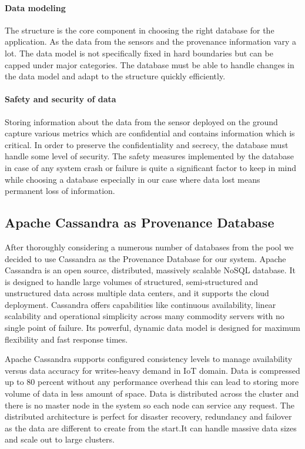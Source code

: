 \paragraph*{Data modeling}
The structure is the core component in choosing the right database for the application. As the data from the sensors and the provenance information vary a lot. The data model is not specifically fixed in hard boundaries but can be capped under major categories. The database must be able to handle changes in the data model and adapt to the structure quickly efficiently.

\paragraph*{Safety and security of data}
Storing information about the data from the sensor deployed on the ground capture various metrics which are confidential and contains information which is critical. In order to preserve the confidentiality and secrecy, the database must handle some level of security. The safety measures implemented by the database in case of any system crash or failure is quite a significant factor to keep in mind while choosing a database especially in our case where data lost means permanent loss of information.

\subsection{Apache Cassandra as Provenance Database}

After thoroughly considering a numerous number of databases from the pool we decided to use Cassandra as the Provenance Database for our system.
Apache Cassandra is an open source, distributed, massively scalable NoSQL database. It is designed to handle large volumes of structured, semi-structured and unstructured data across multiple data centers, and it supports the cloud deployment. Cassandra offers capabilities like continuous availability, linear scalability and operational simplicity across many commodity servers with no single point of failure. Its powerful, dynamic data model is designed for maximum flexibility and fast response times. 

Apache Cassandra supports configured consistency levels to manage availability versus data accuracy for writes-heavy demand in IoT domain.  Data is compressed up to 80 percent without any performance overhead this can lead to storing more volume of data in less amount of space. 
Data is distributed across the cluster and there is no master node in the system so each node can service any request. The distributed architecture is perfect for disaster recovery, redundancy and failover as the data are different to create from the start.It can handle massive data sizes and scale out to large clusters. 

